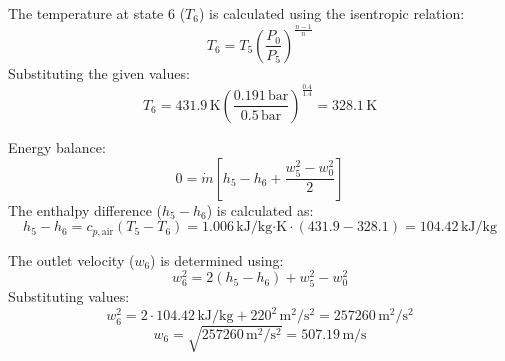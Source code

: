 The temperature at state 6 (\( T_6 \)) is calculated using the isentropic relation:  
\[
T_6 = T_5 \left( \frac{P_0}{P_5} \right)^{\frac{n-1}{n}}
\]  
Substituting the given values:  
\[
T_6 = 431.9 \, \text{K} \left( \frac{0.191 \, \text{bar}}{0.5 \, \text{bar}} \right)^{\frac{0.4}{1.4}} = 328.1 \, \text{K}
\]  

Energy balance:  
\[
0 = \dot{m} \left[ h_5 - h_6 + \frac{w_5^2 - w_0^2}{2} \right]
\]  
The enthalpy difference (\( h_5 - h_6 \)) is calculated as:  
\[
h_5 - h_6 = c_{p,\text{air}} (T_5 - T_6) = 1.006 \, \text{kJ}/\text{kg·K} \cdot (431.9 - 328.1) = 104.42 \, \text{kJ}/\text{kg}
\]  

The outlet velocity (\( w_6 \)) is determined using:  
\[
w_6^2 = 2(h_5 - h_6) + w_5^2 - w_0^2
\]  
Substituting values:  
\[
w_6^2 = 2 \cdot 104.42 \, \text{kJ}/\text{kg} + 220^2 \, \text{m}^2/\text{s}^2 = 257260 \, \text{m}^2/\text{s}^2
\]  
\[
w_6 = \sqrt{257260 \, \text{m}^2/\text{s}^2} = 507.19 \, \text{m}/\text{s}
\]